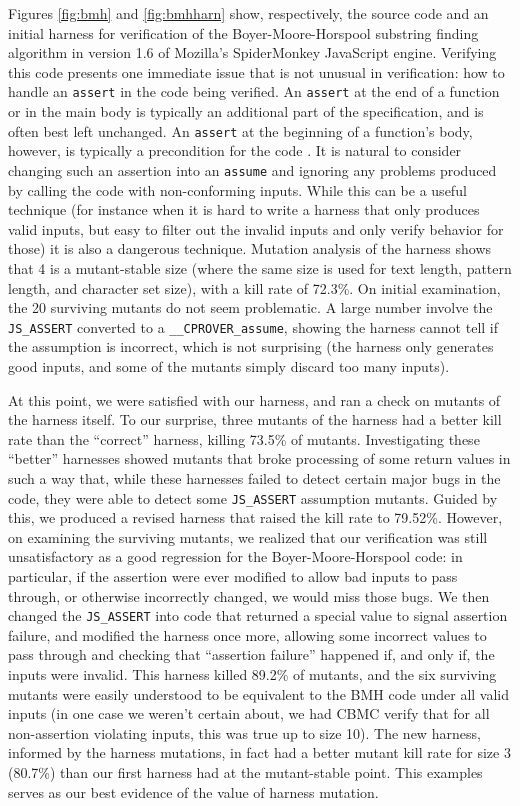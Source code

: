 \documentclass{svjour3}
\begin{document}
Figures \ref{fig:bmh} and \ref{fig:bmhharn} show, respectively, the
source code and an initial harness for verification of the
Boyer-Moore-Horspool substring finding algorithm \cite{BMH,CFV13} in
version 1.6 of Mozilla's SpiderMonkey JavaScript engine.  Verifying
this code presents one immediate issue that is not unusual in
verification: how to handle an {\tt assert} in the code being
verified.  An {\tt assert} at the end of a function or in the main
body is typically an additional part of the specification, and is
often best left unchanged.  An {\tt assert} at the beginning of a
function's body, however, is typically a precondition for the code \cite{CFV13}.  It is natural to consider changing such an assertion into
an {\tt assume} and ignoring any problems produced by calling the code
with non-conforming inputs.  While this can be a useful technique (for
instance when it is hard to write a harness that only produces valid
inputs, but easy to filter out the invalid inputs and only verify
behavior for those) it is also a dangerous technique.  Mutation
analysis of the harness shows that 4 is a mutant-stable size (where
the same size is used for text length, pattern length, and character
set size), with a kill rate of 72.3\%.  On initial examination, the 20
surviving mutants do not seem problematic.  A large number involve the
{\tt JS\_ASSERT} converted to a {\tt \_\_CPROVER\_assume}, showing the
harness cannot tell if the assumption is incorrect, which is not
surprising (the harness only generates good inputs, and some of the
mutants simply discard too many inputs).

At this point, we were satisfied with our harness, and ran a check on
mutants of the harness itself.  To our surprise, three mutants of the
harness had a better kill rate than the ``correct'' harness, killing
73.5\% of mutants.  Investigating these ``better'' harnesses showed
mutants that broke processing of some return values in such a way
that, while these harnesses failed to detect certain major bugs in the
code, they were able to detect some {\tt JS\_ASSERT} assumption
mutants.  Guided by this, we produced a revised harness that raised
the kill rate to 79.52\%.  However, on examining the surviving
mutants, we realized that our verification was still unsatisfactory as
a good regression for the Boyer-Moore-Horspool code: in particular, if
the assertion were ever modified to allow bad inputs to pass through,
or otherwise incorrectly changed, we would miss those bugs.  We then
changed the {\tt JS\_ASSERT} into code that returned a special value
to signal assertion failure, and modified the harness once more,
allowing some incorrect values to pass through and checking that
``assertion failure'' happened if, and only if, the inputs were
invalid.  This harness killed 89.2\% of mutants, and the six surviving
mutants were easily understood to be equivalent to the BMH code under
all valid inputs (in one case we weren't certain about, we had CBMC
verify that for all non-assertion violating inputs, this was true up
to size 10).  The new harness, informed by the harness mutations, in
fact had a better mutant kill rate for size 3 (80.7\%) than our first
harness had at the mutant-stable point.  This examples serves as our
best evidence of the value of harness mutation.
\end{document}
